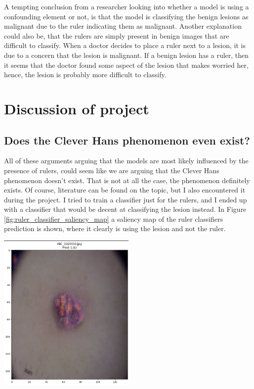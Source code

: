 A tempting conclusion from a researcher looking into whether a model is using a confounding element or not,
is that the model is classifying the benign lesions as malignant due to the ruler indicating them 
as malignant.
Another explanation could also be, that the rulers are simply present in benign images that are 
difficult to classify.
When a doctor decides to place a ruler next to a lesion,
it is due to a concern that the lesion is malignant.
If a benign lesion has a ruler, then it seems that the doctor found 
some aspect of the lesion that makes worried her, 
hence, the lesion is probably more difficult to classify.

\section{Discussion of project}
\subsection{Does the Clever Hans phenomenon even exist?}
All of these arguments arguing that the models are most likely influenced by the presence of rulers,
could seem like we are arguing that the Clever Hans phenomenon doesn't exist.
That is not at all the case, the phenomenon definitely exists.
Of course, literature can be found on the topic, but I also encountered it during the project.
I tried to train a classifier just for the rulers, and I ended up with a classifier that would
be decent at classifying the lesion instead. 
In Figure \ref{fig:ruler_classifier_saliency_map} a saliency map of the ruler classifiers prediction is shown,
where it clearly is using the lesion and not the ruler.

\begin{center}
    \includegraphics[width=0.5\textwidth]{images/ruler_classifier_saliency.png}
    \label{fig:ruler_classifier_saliency_map}
\end{center}

